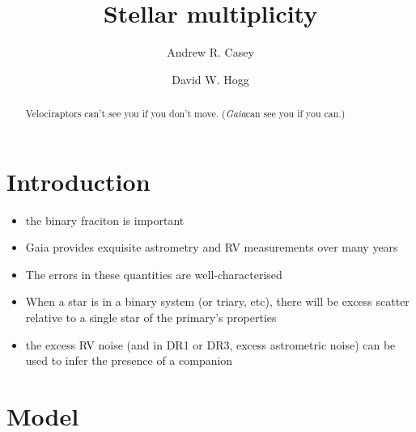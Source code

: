 \documentclass[twocolumn]{aastex61}
\newcommand{\project}[1]{\textsl{#1}}
\newcommand{\Gaia}{\project{Gaia}}
\begin{document}
\title{Stellar multiplicity}


\author[0000-0003-0174-0564]{Andrew R. Casey}

\author[0000-0003-2866-9403]{David W. Hogg}

\begin{abstract}
Velociraptors can't see you if you don't move. (\Gaia can see you if you can.)
\end{abstract}



\section{Introduction} \label{sec:intro}

\begin{itemize}
\item the binary fraciton is important
\item Gaia provides exquisite astrometry and RV measurements over many years
\item The errors in these quantities are well-characterised
\item When a star is in a binary system (or triary, etc), there will be excess scatter relative to a single star of the primary's properties
\item the excess RV noise (and in DR1 or DR3, excess astrometric noise) can be used to infer the presence of a companion
\end{itemize}


\section{Model}


\end{document}
